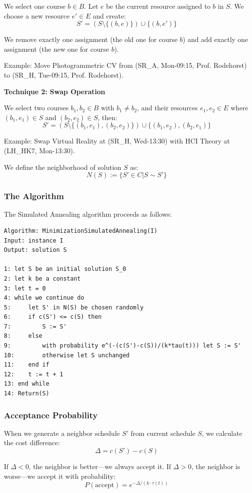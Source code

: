 \documentclass[11pt,a4paper]{article}
\begin{document}
We select one course $b \in B$. Let $e$ be the current resource assigned to $b$ in $S$. We choose a new resource $e' \in E$ and create:
$$S' = (S \setminus \{(b,e)\}) \cup \{(b,e')\}$$

We remove exactly one assignment (the old one for course $b$) and add exactly one assignment (the new one for course $b$).

Example: Move Photogrammetric CV from (SR\_A, Mon-09:15, Prof. Rodehorst) to (SR\_H, Tue-09:15, Prof. Rodehorst).

\textbf{Technique 2: Swap Operation}

We select two courses $b_1, b_2 \in B$ with $b_1 \neq b_2$, and their resources $e_1, e_2 \in E$ where $(b_1,e_1) \in S$ and $(b_2,e_2) \in S$, then:
$$S' = (S \setminus \{(b_1,e_1), (b_2,e_2)\}) \cup \{(b_1,e_2), (b_2,e_1)\}$$

Example: Swap Virtual Reality at (SR\_H, Wed-13:30) with HCI Theory at (LH\_HK7, Mon-13:30).

We define the neighborhood of solution $S$ as:
$$N(S) := \{S' \in C | S \sim S'\}$$

\subsubsection{The Algorithm}

The Simulated Annealing algorithm proceeds as follows:

\begin{verbatim}
Algorithm: MinimizationSimulatedAnnealing(I)
Input: instance I
Output: solution S

1: let S be an initial solution S_0
2: let k be a constant
3: let t = 0
4: while we continue do
5:     let S' in N(S) be chosen randomly
6:     if c(S') <= c(S) then
7:         S := S'
8:     else
9:         with probability e^(-(c(S')-c(S))/(k*tau(t))) let S := S'
10:        otherwise let S unchanged
11:    end if
12:    t := t + 1
13: end while
14: Return(S)
\end{verbatim}

\subsubsection{Acceptance Probability}

When we generate a neighbor schedule $S'$ from current schedule $S$, we calculate the cost difference:
$$\Delta = c(S') - c(S)$$

If $\Delta < 0$, the neighbor is better—we always accept it. If $\Delta > 0$, the neighbor is worse—we accept it with probability:
$$P(\text{accept}) = e^{-\Delta / (k \cdot \tau(t))}$$
\end{document}
